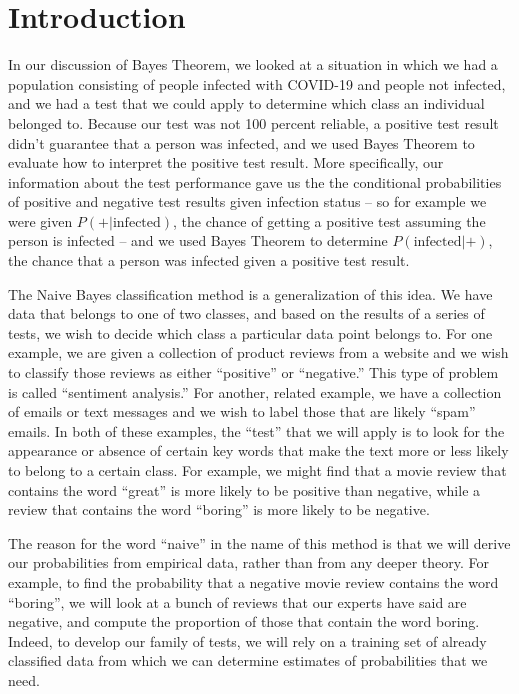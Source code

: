 \documentclass[
  oneside]{scrbook}
\begin{document}
\hypertarget{introduction-2}{%
\section{Introduction}\label{introduction-2}}

In our discussion of Bayes Theorem, we looked at a situation in which we
had a population consisting of people infected with COVID-19 and people
not infected, and we had a test that we could apply to determine which
class an individual belonged to. Because our test was not 100 percent
reliable, a positive test result didn't guarantee that a person was
infected, and we used Bayes Theorem to evaluate how to interpret the
positive test result. More specifically, our information about the test
performance gave us the the conditional probabilities of positive and
negative test results given infection status -- so for example we were
given \(P(+|\mathrm{infected})\), the chance of getting a positive test
assuming the person is infected -- and we used Bayes Theorem to
determine \(P(\mathrm{infected}|+)\), the chance that a person was
infected given a positive test result.

The Naive Bayes classification method is a generalization of this idea.
We have data that belongs to one of two classes, and based on the
results of a series of tests, we wish to decide which class a particular
data point belongs to. For one example, we are given a collection of
product reviews from a website and we wish to classify those reviews as
either ``positive'' or ``negative.'' This type of problem is called
``sentiment analysis.'' For another, related example, we have a
collection of emails or text messages and we wish to label those that
are likely ``spam'' emails. In both of these examples, the ``test'' that
we will apply is to look for the appearance or absence of certain key
words that make the text more or less likely to belong to a certain
class. For example, we might find that a movie review that contains the
word ``great'' is more likely to be positive than negative, while a
review that contains the word ``boring'' is more likely to be negative.

The reason for the word ``naive'' in the name of this method is that we
will derive our probabilities from empirical data, rather than from any
deeper theory. For example, to find the probability that a negative
movie review contains the word ``boring'', we will look at a bunch of
reviews that our experts have said are negative, and compute the
proportion of those that contain the word boring. Indeed, to develop our
family of tests, we will rely on a training set of already classified
data from which we can determine estimates of probabilities that we
need.
\end{document}

